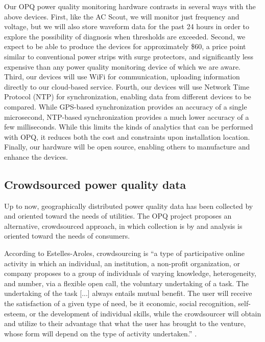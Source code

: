 Our OPQ power quality monitoring hardware contrasts in several ways with the above devices. First, like the AC Scout, we will monitor just frequency and voltage, but we will also store waveform data for the past 24 hours in order to explore the possibility of diagnosis when thresholds are exceeded.  Second, we expect to be able to produce the devices for approximately \$60, a price point similar to conventional power strips with surge protectors, and significantly less expensive than any power quality monitoring device of which we are aware. Third, our devices will use WiFi for communication, uploading information directly to our cloud-based service.  Fourth, our devices will use Network Time Protocol (NTP) for synchronization, enabling data from different devices to be compared.  While GPS-based synchronization provides an accuracy of a single microsecond, NTP-based synchronization provides a much lower accuracy of a few milliseconds. While this limits the kinds of analytics that can be performed with OPQ, it reduces both the cost and constraints upon installation location. Finally, our hardware will be open source, enabling others to manufacture and enhance the devices. 


\subsection{Crowdsourced power quality data}

Up to now, geographically distributed power quality data has been collected by and oriented toward the needs of utilities. The OPQ project proposes an alternative, crowdsourced approach, in which collection is by and analysis is oriented toward the needs of consumers.   

According to Estelles-Aroles, crowdsourcing is ``a type of participative online activity in which an individual, an institution, a non-profit organization, or company proposes to a group of individuals of varying knowledge, heterogeneity, and number, via a flexible open call, the voluntary undertaking of a task. The undertaking of the task [...] always entails mutual benefit. The user will receive the satisfaction of a given type of need, be it economic, social recognition, self-esteem, or the development of individual skills, while the crowdsourcer will obtain and utilize to their advantage that what the user has brought to the venture, whose form will depend on the type of activity undertaken.'' \cite{Estelles-Aroles2012}.

